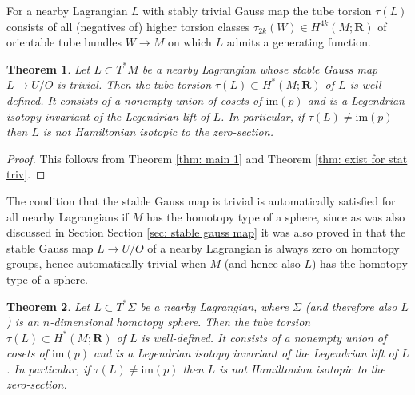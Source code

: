 \documentclass{amsart}
\def\bR{\mathbf{R}}
\newtheorem{theorem}{Theorem}[section]
\theoremstyle{definition}
\theoremstyle{remark}
\newtheorem{inductive lemma}[theorem]{Inductive Lemma}
\begin{document}
For a nearby Lagrangian $L$ with stably trivial Gauss map the tube torsion $\tau(L)$ consists of all (negatives of) higher torsion classes $\tau_{2k}(W) \in H^{4k}(M;\bR)$ of orientable tube bundles $W \to M$ on which $L$ admits a generating function. %


\begin{theorem}\label{thm: tube torsion nearby Lag}
Let $L\subset T^*M$ be a nearby Lagrangian whose stable Gauss map $L \to U/O$ is trivial. Then the tube torsion $\tau(L) \subset H^*(M;\bR)$ of $L$ is well-defined. It consists of a nonempty union of cosets of  $\text{im}(p)$ and is a Legendrian isotopy invariant of the Legendrian lift of $L$. In particular, if $\tau(L) \neq \text{im}(p)$ then $L$ is not Hamiltonian isotopic to the zero-section. 
\end{theorem}

\begin{proof} This follows from Theorem \ref{thm: main 1} and Theorem \ref{thm: exist for stat triv}. \end{proof} 

The condition that the stable Gauss map is trivial is automatically satisfied for all nearby Lagrangians if $M$ has the homotopy type of a sphere, since as was also discussed in Section Section \ref{sec: stable gauss map} it was also proved in \cite{ACGK} that the stable Gauss map $L \to U/O$ of a nearby Lagrangian is always zero on homotopy groups, hence automatically trivial when $M$ (and hence also $L$) has the homotopy type of a sphere.%

\begin{theorem}\label{thm: tube tor Lag spheres}
Let $L\subset T^*\Sigma$ be a nearby Lagrangian, where $\Sigma$ (and therefore also $L$) is an $n$-dimensional homotopy sphere. Then the tube torsion $\tau(L) \subset H^*(M;\bR)$ of $L$ is well-defined. It consists of a nonempty union of cosets of $\text{im}(p)$ and is a Legendrian isotopy invariant of the Legendrian lift of $L$. In particular, if $\tau(L) \neq \text{im}(p)$ then $L$ is not Hamiltonian isotopic to the zero-section. 
\end{theorem}
\end{document}

